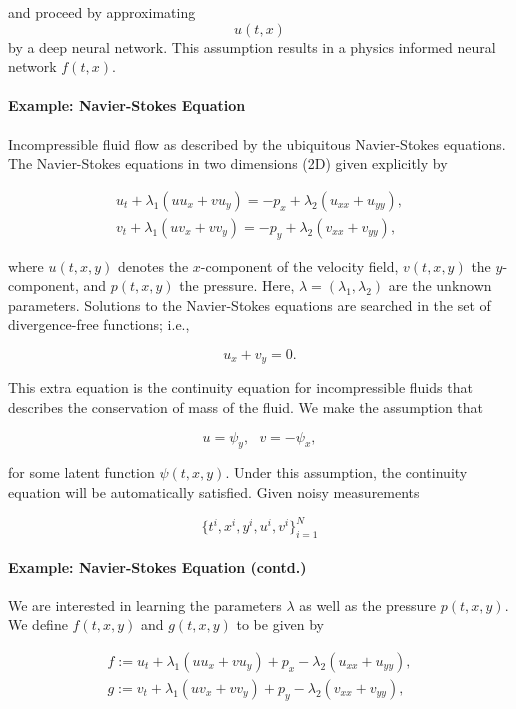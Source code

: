 \documentclass[book.tex]{subfiles}
\begin{document}
and proceed by approximating \[u(t,x)\] by a deep neural network. This
assumption results in a physics informed neural network $f(t,x)$.

\paragraph{Example: Navier-Stokes
Equation}\label{example-navier-stokes-equation}

Incompressible fluid flow as described by the ubiquitous Navier-Stokes
equations. The Navier-Stokes equations in two dimensions (2D) given
explicitly by

\[
\begin{array}{c}
u_t + \lambda_1 (u u_x + v u_y) = -p_x + \lambda_2(u_{xx} + u_{yy}),\\
v_t + \lambda_1 (u v_x + v v_y) = -p_y + \lambda_2(v_{xx} + v_{yy}),
\end{array}
\]

where $u(t, x, y)$ denotes the $x$-component of the velocity field,
$v(t, x, y)$ the $y$-component, and $p(t, x, y)$ the pressure. Here,
$\lambda = (\lambda_1, \lambda_2)$ are the unknown parameters. Solutions
to the Navier-Stokes equations are searched in the set of
divergence-free functions; i.e.,

\[
u_x + v_y = 0.
\]

This extra equation is the continuity equation for incompressible fluids
that describes the conservation of mass of the fluid. We make the
assumption that

\[
u = \psi_y,\ \ \ v = -\psi_x,
\]

for some latent function $\psi(t,x,y)$. Under this assumption, the
continuity equation will be automatically satisfied. Given noisy
measurements

\[
\{t^i, x^i, y^i, u^i, v^i\}_{i=1}^{N}
\]

\paragraph{Example: Navier-Stokes Equation
(contd.)}\label{example-navier-stokes-equation-contd.}

We are interested in learning the parameters $\lambda$ as well as the
pressure $p(t,x,y)$. We define $f(t,x,y)$ and $g(t,x,y)$ to be given by

\[
\begin{array}{c}
f := u_t + \lambda_1 (u u_x + v u_y) + p_x - \lambda_2(u_{xx} + u_{yy}),\\
g := v_t + \lambda_1 (u v_x + v v_y) + p_y - \lambda_2(v_{xx} + v_{yy}),
\end{array}
\]
\end{document}

